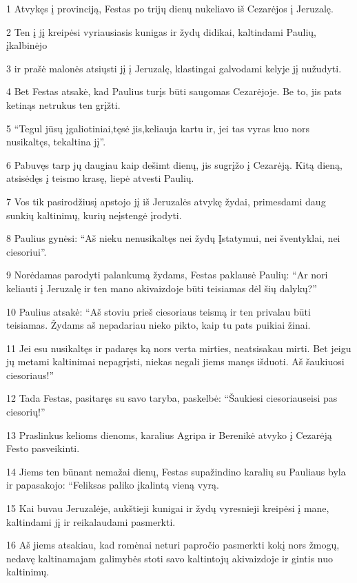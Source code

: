 \par 1 Atvykęs į provinciją, Festas po trijų dienų nukeliavo iš Cezarėjos į Jeruzalę. 
\par 2 Ten į jį kreipėsi vyriausiasis kunigas ir žydų didikai, kaltindami Paulių, įkalbinėjo 
\par 3 ir prašė malonės atsiųsti jį į Jeruzalę, klastingai galvodami kelyje jį nužudyti. 
\par 4 Bet Festas atsakė, kad Paulius turįs būti saugomas Cezarėjoje. Be to, jis pats ketinąs netrukus ten grįžti. 
\par 5 “Tegul jūsų įgaliotiniai,­tęsė jis,­keliauja kartu ir, jei tas vyras kuo nors nusikaltęs, tekaltina jį”. 
\par 6 Pabuvęs tarp jų daugiau kaip dešimt dienų, jis sugrįžo į Cezarėją. Kitą dieną, atsisėdęs į teismo krasę, liepė atvesti Paulių. 
\par 7 Vos tik pasirodžiusį apstojo jį iš Jeruzalės atvykę žydai, primesdami daug sunkių kaltinimų, kurių neįstengė įrodyti. 
\par 8 Paulius gynėsi: “Aš nieku nenusikaltęs nei žydų Įstatymui, nei šventyklai, nei ciesoriui”. 
\par 9 Norėdamas parodyti palankumą žydams, Festas paklausė Paulių: “Ar nori keliauti į Jeruzalę ir ten mano akivaizdoje būti teisiamas dėl šių dalykų?” 
\par 10 Paulius atsakė: “Aš stoviu prieš ciesoriaus teismą ir ten privalau būti teisiamas. Žydams aš nepadariau nieko pikto, kaip tu pats puikiai žinai. 
\par 11 Jei esu nusikaltęs ir padaręs ką nors verta mirties, neatsisakau mirti. Bet jeigu jų metami kaltinimai nepagrįsti, niekas negali jiems manęs išduoti. Aš šaukiuosi ciesoriaus!” 
\par 12 Tada Festas, pasitaręs su savo taryba, paskelbė: “Šaukiesi ciesoriaus­eisi pas ciesorių!” 
\par 13 Praslinkus kelioms dienoms, karalius Agripa ir Berenikė atvyko į Cezarėją Festo pasveikinti. 
\par 14 Jiems ten būnant nemažai dienų, Festas supažindino karalių su Pauliaus byla ir papasakojo: “Feliksas paliko įkalintą vieną vyrą. 
\par 15 Kai buvau Jeruzalėje, aukštieji kunigai ir žydų vyresnieji kreipėsi į mane, kaltindami jį ir reikalaudami pasmerkti. 
\par 16 Aš jiems atsakiau, kad romėnai neturi papročio pasmerkti kokį nors žmogų, nedavę kaltinamajam galimybės stoti savo kaltintojų akivaizdoje ir gintis nuo kaltinimų. 
